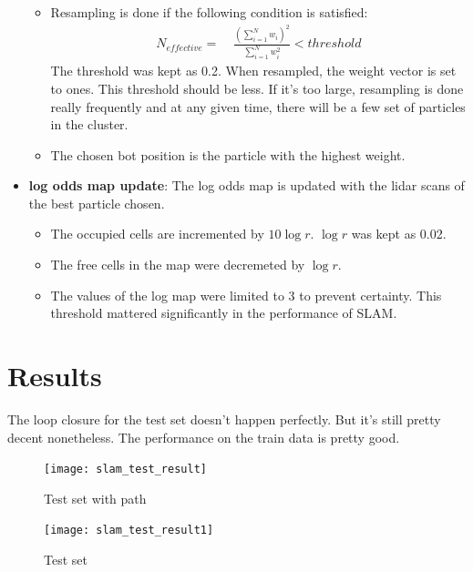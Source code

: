 \documentclass[english]{article}
\begin{document}
\begin{itemize}
\begin{itemize}
	\item Resampling is done if the following condition is satisfied:
	\begin{align*}
	N_{effective} =&\; \frac{(\sum_{i=1}^N w_i )^2}{\sum_{i=1}^{N} w_i^2} < threshold 
	\end{align*}
	The threshold was kept as 0.2. When resampled, the weight vector is set to ones. This threshold should be less. If it's too large, resampling is done really frequently and at any given time, there will be a few set of particles in the cluster.  
	\item The chosen bot position is the particle with the highest weight. 
\end{itemize}

\item \textbf{log odds map update}: The log odds map is updated with the lidar scans of the best particle chosen.
\begin{itemize}
	\item The occupied cells are incremented by $10 \log r$. $\log r$ was kept as 0.02. 
	\item The free cells in the map were decremeted by $\log r$. 
	\item The values of the log map were limited to 3 to prevent certainty. This threshold mattered significantly in the performance of SLAM. 
\end{itemize}


\end{itemize}

\section {Results}

The loop closure for the test set doesn't happen perfectly. But it's still pretty decent nonetheless. The performance on the train data is pretty good. 

\begin{figure}[h]
\centering
\texttt{[image: slam\_test\_result]}
\caption{Test set with path}
\end{figure}

\begin{figure}[h]
\centering
\texttt{[image: slam\_test\_result1]}
\caption{Test set}
\end{figure}
\end{document}
